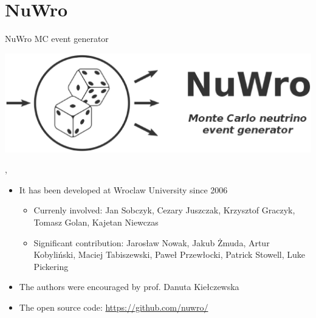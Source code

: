 \section{NuWro}

\begin{slide}[toc=NuWro MC]{NuWro MC event generator}
\null\vfill  
  
  \vspace{-10pt}
  \begin{center}
    \includegraphics[width=0.65\columnwidth]{img/nuwro.eps}
  \end{center}
  \vspace{-30pt}
  {\it\hfill{}}
  
  \sep
  
  \begin{itemize}

    \item It has been developed at Wroclaw University since 2006
    \begin{itemize}
      \item Currenly involved: Jan Sobczyk, Cezary Juszczak, Krzysztof Graczyk, Tomasz Golan, Kajetan Niewczas
      \item Significant contribution: Jarosław Nowak, Jakub Żmuda, Artur Kobyliński, Maciej Tabiszewski, Paweł Przewłocki, Patrick Stowell, Luke Pickering
    \end{itemize}
    \item The authors were encouraged by prof. Danuta Kie{\l}czewska
    \item The open source code: \url{https://github.com/nuwro/}

  \end{itemize}
  
\vfill\null
\end{slide}

